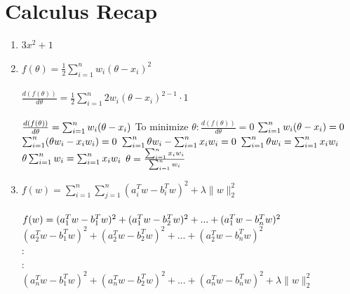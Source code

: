 \documentclass[12pt,letterpaper]{article}
\begin{document}
\section*{Calculus Recap}
    \begin{enumerate}
            \item $3x^2 + 1$
            \item 
                $f( \theta ) =  \frac{1}{2} \sum_{i=1}^{n}  w_{i}(\theta -  x_{i})^2$  \\ \\
                $\frac{d(f(\theta)) }{d\theta} =  \frac{1}{2}  \sum_{i=1}^{n}  2w_{i}(\theta -  x_{i})^{2-1} \cdot 1$ \\ \\
                $\frac{d(f(\theta)) }{d\theta} =  \sum_{i=1}^{n}  w_{i}(\theta -  x_{i}) \\ \\$
                To minimize $\theta: \frac{d(f(\theta)) }{d\theta} = 0$
                $\sum_{i=1}^{n}  w_{i}(\theta -  x_{i}) = 0 \\ \\$
                $\sum_{i=1}^{n}  (\theta w_{i} -  x_{i}w_{i}) = 0 \\ \\$
                $\sum_{i=1}^{n} \theta w_{i} -  \sum_{i=1}^{n} x_{i}w_{i} = 0 \\ \\ $
                $\sum_{i=1}^{n} \theta w_{i} =  \sum_{i=1}^{n} x_{i}w_{i}\\ \\$
                $\theta \sum_{i=1}^{n} w_{i} =  \sum_{i=1}^{n} x_{i}w_{i}\\ \\$
                $\theta =  \frac{\sum_{i=1}^{n} x_{i}w_{i}}{\sum_{i=1}^{n} w_{i}}\\ \\$
            \item 
                $f(w) = \sum_{i=1}^{n} \sum_{j=1}^{n} (a_{i}^Tw - b_{i}^Tw)^2 +  \lambda  \parallel w \parallel_{2}^2$ \\ \\
                $f(w) = \\ (a_{1}^Tw - b_{1}^Tw)^2 + (a_{1}^Tw - b_{2}^Tw)^2 + ... + (a_{1}^Tw - b_{n}^Tw)^2$ \\
                $(a_{2}^Tw - b_{1}^Tw)^2 + (a_{2}^Tw - b_{2}^Tw)^2 + ... + (a_{2}^Tw - b_{n}^Tw)^2 $\\
                : \\
                : \\
                $(a_{n}^Tw - b_{1}^Tw)^2 + (a_{n}^Tw - b_{2}^Tw)^2 + ... + (a_{n}^Tw - b_{n}^Tw)^2 + \lambda  \parallel w \parallel_{2}^2$ \\ \\
                

\end{enumerate}
\end{document}
